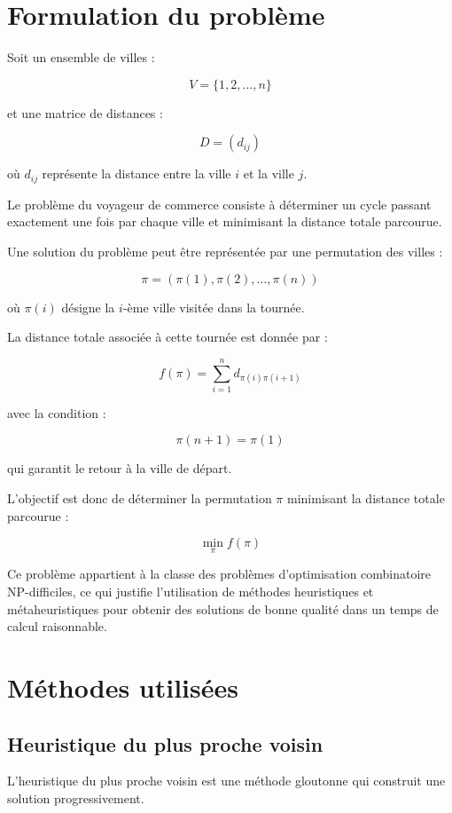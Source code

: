 \documentclass[11pt,a4paper]{article}
\begin{document}
\section{Formulation du problème}

Soit un ensemble de villes :

\[
V = \{1,2,\dots,n\}
\]

et une matrice de distances :

\[
D = (d_{ij})
\]

où $d_{ij}$ représente la distance entre la ville $i$ et la ville $j$.

Le problème du voyageur de commerce consiste à déterminer un cycle
passant exactement une fois par chaque ville et minimisant la distance
totale parcourue.

Une solution du problème peut être représentée par une permutation
des villes :

\[
\pi = (\pi(1), \pi(2), \dots, \pi(n))
\]

où $\pi(i)$ désigne la $i$-ème ville visitée dans la tournée.

La distance totale associée à cette tournée est donnée par :

\[
f(\pi) = \sum_{i=1}^{n} d_{\pi(i)\pi(i+1)}
\]

avec la condition :

\[
\pi(n+1) = \pi(1)
\]

qui garantit le retour à la ville de départ.

L’objectif est donc de déterminer la permutation $\pi$ minimisant
la distance totale parcourue :

\[
\min_{\pi} f(\pi)
\]

Ce problème appartient à la classe des problèmes
d’optimisation combinatoire NP-difficiles, ce qui
justifie l’utilisation de méthodes heuristiques et
métaheuristiques pour obtenir des solutions de
bonne qualité dans un temps de calcul raisonnable.

\section{Méthodes utilisées}

\subsection{Heuristique du plus proche voisin}

L’heuristique du plus proche voisin est une méthode gloutonne
qui construit une solution progressivement.
\end{document}
